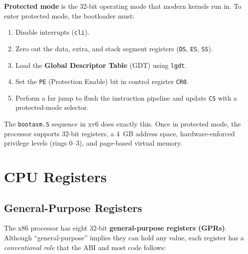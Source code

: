 \documentclass[11pt]{article}
\begin{document}
\textbf{Protected mode} is the 32-bit operating mode that modern kernels run in. To enter
protected mode, the bootloader must:

\begin{enumerate}
    \item Disable interrupts (\texttt{cli}).
    \item Zero out the data, extra, and stack segment registers
          (\texttt{DS}, \texttt{ES}, \texttt{SS}).
    \item Load the \textbf{Global Descriptor Table} (GDT) using \texttt{lgdt}.
    \item Set the \texttt{PE} (Protection Enable) bit in control register \texttt{CR0}.
    \item Perform a far jump to flush the instruction pipeline and update \texttt{CS}
          with a protected-mode selector.
\end{enumerate}

The \texttt{bootasm.S} sequence in xv6 does exactly this. Once in protected mode, the
processor supports 32-bit registers, a 4~GB address space, hardware-enforced privilege
levels (rings 0--3), and page-based virtual memory.

\section{CPU Registers}

\subsection{General-Purpose Registers}

The x86 processor has eight 32-bit \textbf{general-purpose registers (GPRs)}. Although
``general-purpose'' implies they can hold any value, each register has a \emph{conventional
role} that the ABI and most code follows:
\end{document}
